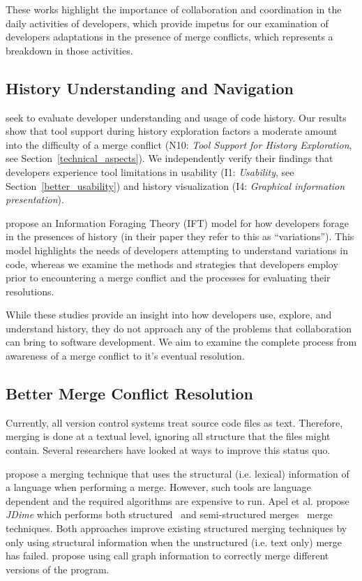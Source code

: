 These works highlight the importance of collaboration and coordination in the daily activities of developers, which provide impetus for our examination of developers adaptations in the presence of merge conflicts, which represents a breakdown in those activities.

\subsection{History Understanding and Navigation}

\citet{Mihai_lenses} seek to evaluate developer understanding and usage of code history. 
Our results show that tool support during history exploration factors a moderate amount into the difficulty of a merge conflict (N10: \textit{Tool Support for History Exploration}, see Section~\ref{technical_aspects}).
We independently verify their findings that developers experience tool limitations in usability (I1: \textit{Usability}, see Section~\ref{better_usability}) and history visualization (I4: \textit{Graphical information presentation}).

\citet{ragavan_pfis-v_2017} propose an Information Foraging Theory (IFT) model for how developers forage in the presences of history (in their paper they refer to this as ``variations'').
This model highlights the needs of developers attempting to understand variations in code, whereas we examine the methods and strategies that developers employ prior to encountering a merge conflict and the processes for evaluating their resolutions.

While these studies provide an insight into how developers use, explore, and understand history, they do not approach any of the problems that collaboration can bring to software development.
We aim to examine the complete process from awareness of a merge conflict to it's eventual resolution.

\subsection{Better Merge Conflict Resolution}

Currently, all version control systems treat source code files as text.
Therefore, merging is done at a textual level, ignoring all structure that the files might contain.
Several researchers have looked at ways to improve this status quo.

\citet{westfechtel_structure-oriented_1991} propose a merging technique that uses the structural (i.e. lexical) information of a language when performing a merge. However, such tools are language dependent and the required algorithms are expensive to run.
Apel et al. propose \emph{JDime} which performs both structured~\cite{apel_structured_2012-1} and semi-structured merges~\cite{apel_semistructured_2011} merge techniques.
Both approaches improve existing structured merging techniques by only using structural information when the unstructured (i.e. text only) merge has failed.
\citet{binkley_program_1995} propose using call graph information to correctly merge different versions of the program.

